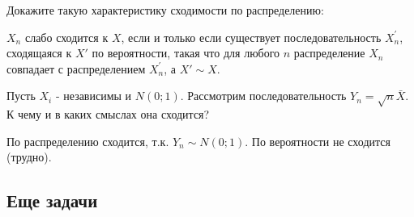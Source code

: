 {%



Докажите такую характеристику сходимости по распределению:

$X_{n}$ слабо сходится к $X$, если и только если существует последовательность $X_{n}^{'}$, сходящаяся к $X'$ по вероятности, такая что для любого $n$ распределение $X_{n}$ совпадает с распределением $X_{n}^{'}$, а $ X'\sim X $.



Пусть $ X_{i} $ - независимы и $ N(0;1) $. Рассмотрим последовательность $ Y_{n}=\sqrt{n}\bar{X} $. К чему и в каких смыслах она сходится? 

По распределению сходится, т.к. $ Y_{n}\sim N(0;1) $. По вероятности не сходится (трудно). 




}\subsection{Еще задачи}


